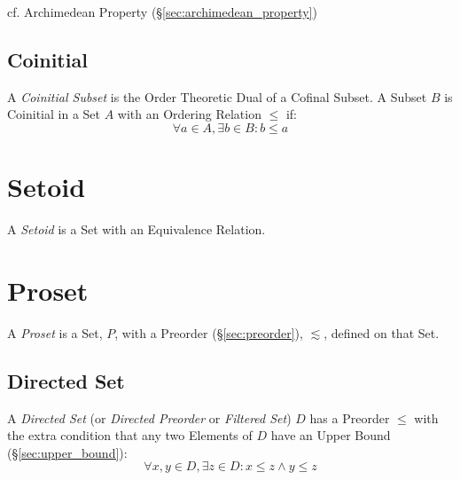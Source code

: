cf. Archimedean Property (\S\ref{sec:archimedean_property})



\subsection{Coinitial}\label{sec:coinitial_subset}

A \emph{Coinitial Subset} is the Order Theoretic Dual of a Cofinal
Subset. A Subset $B$ is Coinitial in a Set $A$ with an Ordering
Relation $\leq$ if:
\[
  \forall a \in A, \exists b \in B : b \leq a
\]



\section{Setoid}\label{sec:setoid}

A \emph{Setoid} is a Set with an Equivalence Relation.



\section{Proset}\label{sec:proset}

A \emph{Proset} is a Set, $P$, with a Preorder
(\S\ref{sec:preorder}), $\lesssim$, defined on that Set.



\subsection{Directed Set}\label{sec:directed_set}

A \emph{Directed Set} (or \emph{Directed Preorder} or \emph{Filtered
  Set}) $D$ has a Preorder $\leq$ with the extra condition that any
two Elements of $D$ have an Upper Bound (\S\ref{sec:upper_bound}):
\[
  \forall x, y \in D, \exists z \in D : x \leq z \wedge y \leq z
\]


